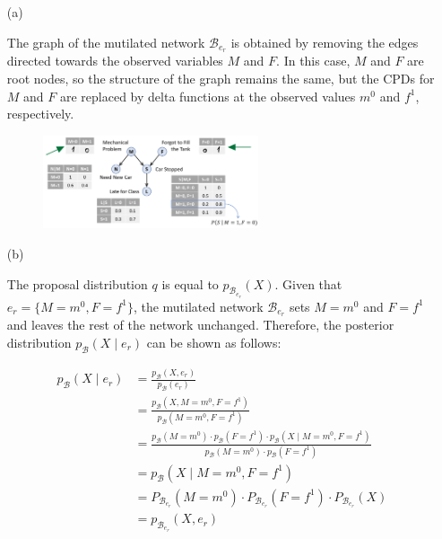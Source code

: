 \documentclass[a4 paper]{article}
\begin{document}
\begin{enumerate}
    \item[(a)] 

    The graph of the mutilated network \( \mathcal{B}_{e_r} \) is obtained by removing the edges directed towards the observed variables \( M \) and \( F \). In this case, \( M \) and \( F \) are root nodes, so the structure of the graph remains the same, but the CPDs for \( M \) and \( F \) are replaced by delta functions at the observed values \( m^0 \) and \( f^1 \), respectively.

    \begin{figure}[H]
        \centering
        \includegraphics[width=0.6\textwidth]{./plots/11a.jpeg}
    \end{figure}
    
    \item[(b)] 
    

    The proposal distribution \( q \) is equal to \( p_{\mathcal{B}_{e_r}}(X) \). Given that \( e_r = \{M = m^0, F = f^1\} \), the mutilated network \( \mathcal{B}_{e_r} \) sets \( M = m^0 \) and \( F = f^1 \) and leaves the rest of the network unchanged. Therefore, the posterior distribution \( p_{\mathcal{B}}(X \mid e_r) \) can be shown as follows:

    \begin{align*}
        p_{\mathcal{B}}(X \mid e_r) &= \frac{p_{\mathcal{B}}(X, e_r)}{p_{\mathcal{B}}(e_r)} \\
        &= \frac{p_{\mathcal{B}}(X, M = m^0, F = f^1)}{p_{\mathcal{B}}(M = m^0, F = f^1)} \\
        &= \frac{p_{\mathcal{B}}(M = m^0) \cdot p_{\mathcal{B}}(F = f^1) \cdot p_{\mathcal{B}}(X \mid M = m^0, F = f^1)}{p_{\mathcal{B}}(M = m^0) \cdot p_{\mathcal{B}}(F = f^1)} \\
        &= p_{\mathcal{B}}(X \mid M = m^0, F = f^1) \\
        &= P_{\mathcal{B}_{e_r}}(M = m^0) \cdot P_{\mathcal{B}_{e_r}}(F = f^1) \cdot P_{\mathcal{B}_{e_r}}(X) \\
        &= p_{\mathcal{B}_{e_r}}(X, e_r) 
        \end{align*}
    


\end{enumerate}
\end{document}

